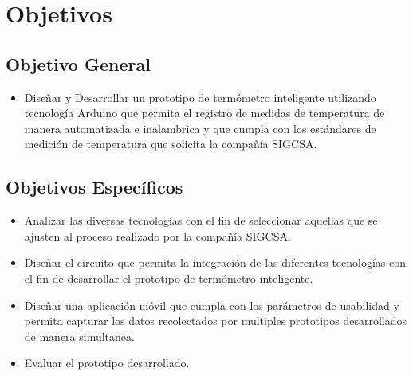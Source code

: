 \section{Objetivos}

\subsection{Objetivo General}

\begin{itemize}
	
\item 
Diseñar y Desarrollar un prototipo de termómetro inteligente utilizando tecnología Arduino que permita el registro de medidas de temperatura de manera automatizada e inalambrica y que cumpla con los estándares de medición de temperatura que solicita la compañía SIGCSA.
	
\end{itemize}

\subsection{Objetivos Específicos}

\begin{itemize}
	
\item 
Analizar las diversas tecnologías con el fin de seleccionar aquellas que se ajusten al proceso realizado por la compañía SIGCSA.

\item 
Diseñar el circuito que permita la integración de las diferentes tecnologías con el fin de desarrollar el prototipo de termómetro inteligente.

\item 
Diseñar una aplicación móvil que cumpla con los parámetros de usabilidad y permita capturar los datos recolectados por multiples prototipos desarrollados de manera simultanea.

\item 
Evaluar el prototipo desarrollado.
	
\end{itemize}

\clearpage